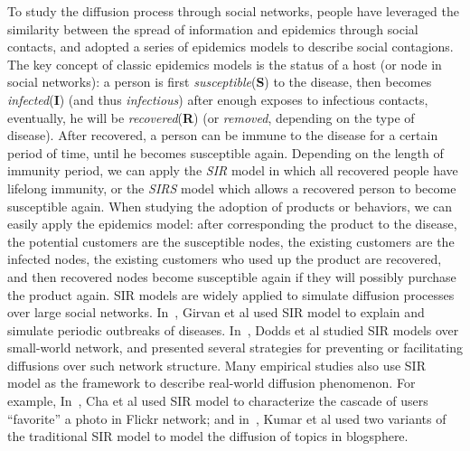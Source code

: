 \documentclass[phd,tocprelim]{cornell}
\begin{document}
To study the diffusion process through social networks, people have leveraged the similarity between the spread of information and epidemics through social contacts, and adopted a series of epidemics models to describe social contagions\cite{bailey-1987}. The key concept of classic epidemics models is the status of a host (or node in social networks): a person is first \emph{susceptible}(\textbf{S}) to the disease, then becomes \emph{infected}(\textbf{I}) (and thus \emph{infectious}) after enough exposes to infectious contacts, eventually, he will be \emph{recovered}(\textbf{R}) (or \emph{removed}, depending on the type of disease). After recovered, a person can be immune to the disease for a certain period of time, until he becomes susceptible again. Depending on the length of immunity period, we can apply the \emph{SIR} model in which all recovered people have lifelong immunity, or the \emph{SIRS} model which allows a recovered person to become susceptible again. When studying the adoption of products or behaviors, we can easily apply the epidemics model: after corresponding the product to the disease, the potential customers are the susceptible nodes, the existing customers are the infected nodes, the existing customers who used up the product are recovered, and then recovered nodes become susceptible again if they will possibly purchase the product again. SIR models are widely applied to simulate diffusion processes over large social networks. In~\cite{Girvan-2002}, Girvan et al used SIR model to explain and simulate periodic outbreaks of diseases. In~\cite{Dodds:2005}, Dodds et al studied SIR models over small-world network\cite{Watts-1998}, and presented several strategies for preventing or facilitating diffusions over such network structure. Many empirical studies also use SIR model as the framework to describe real-world diffusion phenomenon. For example, In~\cite{Cha-2008}, Cha et al used SIR model to characterize the cascade of users ``favorite'' a photo in Flickr network; and in~\cite{Kumar-2004}, Kumar et al used two variants of the traditional SIR model to model the diffusion of topics in blogsphere.
\end{document}
